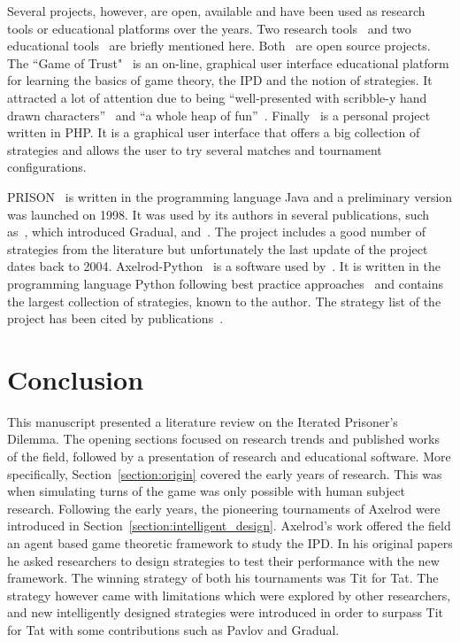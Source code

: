 Several projects, however, are open, available and have been used as research
tools or educational platforms over the years. Two research tools~\cite{prison,
axelrodproject} and two educational tools~\cite{pd_trust, pd_game} are briefly
mentioned here. Both~\cite{prison, axelrodproject} are open
source projects.
The ``Game of Trust"~\cite{pd_trust} is an on-line, graphical user interface
educational platform for learning the basics of game theory, the IPD
and the notion of strategies. It attracted a lot of attention
due to being ``well-presented with scribble-y hand drawn
characters''~\cite{trust_blogb} and ``a whole heap of fun''~\cite{trust_bloga}.
Finally~\cite{pd_game} is a personal project written in PHP. It is a graphical user
interface that offers a big collection of strategies and allows the user to try
several matches and tournament configurations.

PRISON~\cite{prison} is written in the programming
language Java and a preliminary version was launched on 1998. It was used by its
authors in several publications, such as~\cite{Beaufils1997}, which introduced
Gradual, and~\cite{Beaufils1988}. The project includes a good number of
strategies from the literature but unfortunately the last update of the project
dates back to 2004. Axelrod-Python~\cite{axelrodproject} is a software used
by~\cite{Knight2017,KnightHGC17, Goodman2018, Wang2017}. It is written in the
programming language Python following best practice approaches~\cite{Aberdour2007,
Benureau2018} and contains the
largest collection of strategies, known to the author. The strategy list of
the project has been cited by publications~\cite{Anastassacos2018, Hayes2017,
Neumann2018}.

\section{Conclusion}

This manuscript presented a literature review on the Iterated Prisoner's
Dilemma. The opening sections focused on research trends and published works of
the field, followed by a presentation of research and educational software.
More specifically, Section~\ref{section:origin}
covered the early years of research. This was when simulating turns of the game
was only possible with human subject research.
Following the early years, the pioneering tournaments of Axelrod were introduced in
Section~\ref{section:intelligent_design}. Axelrod's work offered the field an
agent based game theoretic framework to study the IPD.
In his original papers he asked researchers to design strategies to test their
performance with the new framework. The winning strategy of both his tournaments
was Tit for Tat. The strategy however came with limitations which were explored
by other researchers, and new intelligently designed strategies were introduced in
order to surpass Tit for Tat with some contributions such as Pavlov and Gradual.

